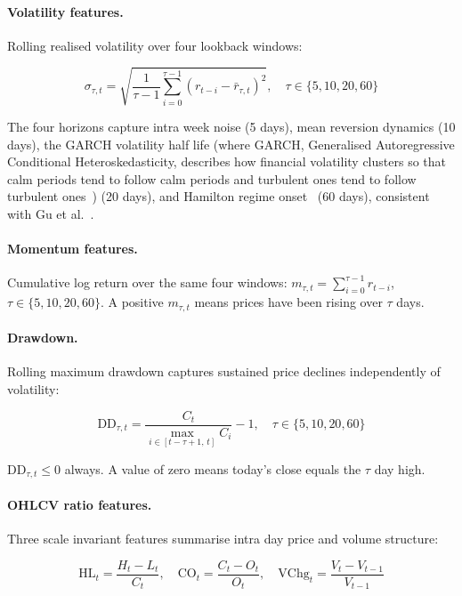 \paragraph{Volatility features.}
Rolling realised volatility over four lookback windows:

\begin{equation}
  \sigma_{\tau,t} = \sqrt{\frac{1}{\tau-1} \sum_{i=0}^{\tau-1} (r_{t-i} - \bar{r}_{\tau,t})^2},
  \quad \tau \in \{5, 10, 20, 60\}
  \label{eq:realised_vol}
\end{equation}

The four horizons capture intra week noise (5 days), mean reversion dynamics (10 days), the GARCH volatility half life (where GARCH, Generalised Autoregressive Conditional Heteroskedasticity, describes how financial volatility clusters so that calm periods tend to follow calm periods and turbulent ones tend to follow turbulent ones~\cite{engle1982,bollerslev1986}) (20 days), and Hamilton regime onset~\cite{hamilton1989} (60 days), consistent with Gu et al.~\cite{gu2020}.

\paragraph{Momentum features.}
Cumulative log return over the same four windows:
$m_{\tau,t} = \sum_{i=0}^{\tau-1} r_{t-i}$, $\tau \in \{5, 10, 20, 60\}$.
A positive $m_{\tau,t}$ means prices have been rising over $\tau$ days.

\paragraph{Drawdown.}
Rolling maximum drawdown captures sustained price declines independently of volatility:

\begin{equation}
  \text{DD}_{\tau,t} = \frac{C_t}{\max_{i \in [t-\tau+1,\,t]} C_i} - 1,
  \quad \tau \in \{5, 10, 20, 60\}
  \label{eq:drawdown}
\end{equation}

$\text{DD}_{\tau,t} \leq 0$ always. A value of zero means today's close equals the $\tau$ day high.

\paragraph{OHLCV ratio features.}
Three scale invariant features summarise intra day price and volume structure:

\begin{equation}
  \text{HL}_t = \frac{H_t - L_t}{C_t}, \quad
  \text{CO}_t = \frac{C_t - O_t}{O_t}, \quad
  \text{VChg}_t = \frac{V_t - V_{t-1}}{V_{t-1}}
  \label{eq:ohlcv_ratios}
\end{equation}

